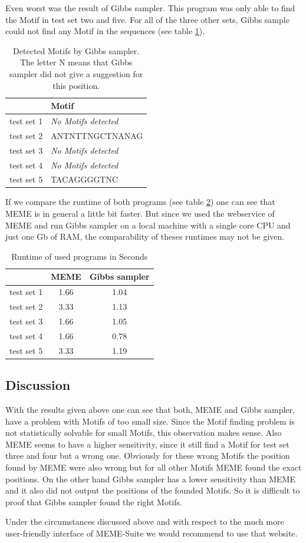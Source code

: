 \documentclass[%
   10pt,              %
   nenglish,           %
   a4paper,           %
   DIV11,             %
]{scrartcl}%
\begin{document}
Even worst was the result of Gibbs sampler. This program was only able to find the Motif in test set 
two and five. For all of the three other sets, Gibbs sample could not find any Motif in the sequences
(see table \ref{tab:gibbsResult}).

\begin{table}[ht]
 \centering
 \caption{Detected Motifs by Gibbs sampler. The letter N means that Gibbs sampler did not give a suggestion for this position.}
 \begin{tabular}{|l|l|}
  \hline
    & Motif \\
  \hline
  test set 1 & \textit{No Motifs detected} \\
  test set 2 & ANTNTTNGCTNANAG \\
  test set 3 & \textit{No Motifs detected} \\
  test set 4 & \textit{No Motifs detected} \\
  test set 5 & TACAGGGGTNC \\
  \hline
 \end{tabular}
 \label{tab:gibbsResult} 
\end{table}

If we compare the runtime of both programs (see table \ref{tab:runtime}) one can see that MEME is in 
general a little bit faster. But since we used the webservice of MEME and run Gibbs sampler on a local 
machine with a single core CPU and just one Gb of RAM, the comparability of theses runtimes may not 
be given.

\begin{table}
 \centering
 \caption{Runtime of used programs in Seconds}
 \begin{tabular}{|c|c|c|}
  \hline
    & MEME & Gibbs sampler \\
  \hline
  test set 1 & 1.66 & 1.04 \\
  test set 2 & 3.33 & 1.13 \\
  test set 3 & 1.66 & 1.05 \\
  test set 4 & 1.66 & 0.78 \\
  test set 5 & 3.33 & 1.19 \\
  \hline
 \end{tabular}
 \label{tab:runtime}
\end{table}


\subsection*{Discussion}

With the results given above one can see that both, MEME and Gibbs sampler, have a problem with 
Motifs of too small size. Since the Motif finding problem is not statistically solvable for small 
Motifs\cite{bioinf1}, this observation makes sense. Also MEME seems to have a higher sensitivity, 
since it still find a Motif for test set three and four but a wrong one. Obviously for these wrong 
Motifs the position found by MEME were also wrong but for all other Motifs MEME found the exact 
positions. On the other hand Gibbs sampler has a lower sensitivity than MEME and it also did not 
output the positions of the founded Motifs. So it is difficult to proof that Gibbs sampler found 
the right Motifs.

Under the circumstances discussed above and with respect to the much more user-friendly interface of 
MEME-Suite we would recommend to use that website.

\newpage


 
\end{document}
